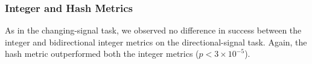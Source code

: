 \subsubsection{Integer and Hash Metrics}

As in the changing-signal task, we observed no difference in success between the integer and bidirectional integer metrics on the directional-signal task.
Again, the hash metric outperformed both the integer metrics ($p < 3\times10^{-5}$).



